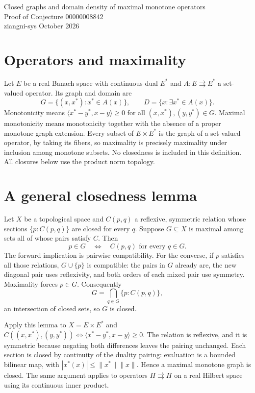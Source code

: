 \documentclass[10pt,a4paper]{article}
\begin{document}
\begin{center}
{\Large Closed graphs and domain density of maximal monotone operators}\\[4pt]
{\large Proof of Conjecture 00000008842}\\[6pt]
ziangni-sys  October 2026
\end{center}

\section*{Operators and maximality}
Let $E$ be a real Banach space with continuous dual $E^*$ and
$A:E\rightrightarrows E^*$ a set-valued operator. Its graph and domain are
\[
G=\{(x,x^*):x^*\in A(x)\},\qquad
D=\{x:\exists x^*\in A(x)\}.
\]
Monotonicity means $\langle x^*-y^*,x-y\rangle\geq0$ for all
$(x,x^*),(y,y^*)\in G$. Maximal monotonicity means monotonicity together
with the absence of a proper monotone graph extension.
Every subset of $E\times E^*$ is the graph of a set-valued operator,
by taking its fibers, so maximality is precisely maximality under
inclusion among monotone subsets. No closedness is included in this
definition. All closures below use the product norm topology.

\section*{A general closedness lemma}
Let $X$ be a topological space and $C(p,q)$ a reflexive, symmetric
relation whose sections $\{p:C(p,q)\}$ are closed for every $q$.
Suppose $G\subseteq X$ is maximal among sets all of whose pairs satisfy $C$.
Then
\[
p\in G\quad\Longleftrightarrow\quad
C(p,q)\text{ for every }q\in G.
\]
The forward implication is pairwise compatibility. For the converse,
if $p$ satisfies all those relations, $G\cup\{p\}$ is compatible:
the pairs in $G$ already are, the new diagonal pair uses reflexivity,
and both orders of each mixed pair use symmetry. Maximality forces $p\in G$.
Consequently
\[
G=\bigcap_{q\in G}\{p:C(p,q)\},
\]
an intersection of closed sets, so $G$ is closed.

Apply this lemma to $X=E\times E^*$ and
$C((x,x^*),(y,y^*))\iff\langle x^*-y^*,x-y\rangle\geq0$.
The relation is reflexive, and it is symmetric because negating both
differences leaves the pairing unchanged. Each section is closed by
continuity of the duality pairing: evaluation is a bounded bilinear map,
with $|x^*(x)|\leq\|x^*\|\|x\|$. Hence a maximal monotone graph is closed.
The same argument applies to operators $H\rightrightarrows H$ on a real
Hilbert space using its continuous inner product.
\end{document}
